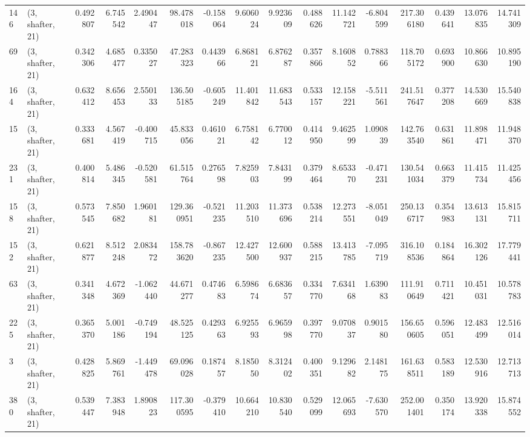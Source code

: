 \begin{tabular}{llrrrrrrrrrrrrrr}
146 &  (3, shafter, 21) &   0.492807 &   6.745542 &   2.490447 &    98.478018 &  -0.158064 &   9.606024 &   9.923609 &  0.488626 &  11.142721 &  -6.804599 &   217.306180 &   0.439641 &  13.076835 &  14.741309 \\
69  &  (3, shafter, 21) &   0.342306 &   4.685477 &   0.335027 &    47.283323 &   0.443966 &   6.868121 &   6.876287 &  0.357866 &   8.160852 &   0.788366 &   118.705172 &   0.693900 &  10.866630 &  10.895190 \\
164 &  (3, shafter, 21) &   0.632412 &   8.656453 &   2.550133 &   136.505185 &  -0.605249 &  11.401842 &  11.683543 &  0.533157 &  12.158221 &  -5.511561 &   241.517647 &   0.377208 &  14.530669 &  15.540838 \\
15  &  (3, shafter, 21) &   0.333681 &   4.567419 &  -0.400715 &    45.833056 &   0.461021 &   6.758142 &   6.770012 &  0.414950 &   9.462599 &   1.090839 &   142.763540 &   0.631861 &  11.898471 &  11.948370 \\
231 &  (3, shafter, 21) &   0.400814 &   5.486345 &  -0.520581 &    61.515764 &   0.276598 &   7.825903 &   7.843199 &  0.379464 &   8.653370 &  -0.471231 &   130.541034 &   0.663379 &  11.415734 &  11.425456 \\
158 &  (3, shafter, 21) &   0.573545 &   7.850682 &   1.960181 &   129.360951 &  -0.521235 &  11.203510 &  11.373696 &  0.538214 &  12.273551 &  -8.051049 &   250.136717 &   0.354983 &  13.613131 &  15.815711 \\
152 &  (3, shafter, 21) &   0.621877 &   8.512248 &   2.083472 &   158.783620 &  -0.867235 &  12.427500 &  12.600937 &  0.588215 &  13.413785 &  -7.095719 &   316.108536 &   0.184864 &  16.302126 &  17.779441 \\
63  &  (3, shafter, 21) &   0.341348 &   4.672369 &  -1.062440 &    44.671277 &   0.474683 &   6.598674 &   6.683657 &  0.334770 &   7.634168 &   1.639083 &   111.910649 &   0.711421 &  10.451031 &  10.578783 \\
225 &  (3, shafter, 21) &   0.365370 &   5.001186 &  -0.749194 &    48.525125 &   0.429363 &   6.925593 &   6.965998 &  0.397770 &   9.070837 &   0.901580 &   156.650605 &   0.596051 &  12.483499 &  12.516014 \\
3   &  (3, shafter, 21) &   0.428825 &   5.869761 &  -1.449478 &    69.096028 &   0.187457 &   8.185050 &   8.312402 &  0.400351 &   9.129682 &   2.148175 &   161.638511 &   0.583189 &  12.530916 &  12.713713 \\
380 &  (3, shafter, 21) &   0.539447 &   7.383948 &   1.890823 &   117.300595 &  -0.379410 &  10.664210 &  10.830540 &  0.529099 &  12.065693 &  -7.630570 &   252.001401 &   0.350174 &  13.920338 &  15.874552 \\

\end{tabular}
